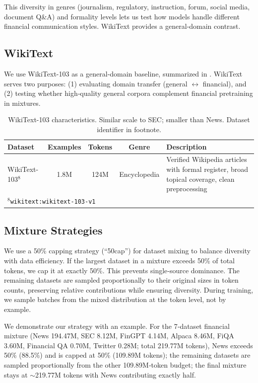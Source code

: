 This diversity in genres (journalism, regulatory, instruction, forum, social media, document Q\&A) and formality levels lets us test how models handle different financial communication styles. WikiText provides a general‑domain contrast.

\subsection{WikiText}

We use WikiText-103 \parencite{merity2016pointer} as a general‑domain baseline, summarized in . WikiText serves two purposes: (1) evaluating domain transfer (general $\leftrightarrow$ financial), and (2) testing whether high‑quality general corpora complement financial pretraining in mixtures.

\begin{table}[htbp]
\centering
\caption[WikiText Dataset Characteristics]{WikiText-103 characteristics. Similar scale to SEC; smaller than News. Dataset identifier in footnote.}
\label{tab:wikitext_dataset}
\small
\begin{tabular}{p{3.4cm}cccp{5.5cm}}
\toprule
\textbf{Dataset} & \textbf{Examples} & \textbf{Tokens} & \textbf{Genre} & \textbf{Description} \\
\midrule
WikiText-103$^8$ & 1.8M & 124M & Encyclopedia & Verified Wikipedia articles with formal register, broad topical coverage, clean preprocessing \\
\bottomrule
\multicolumn{5}{l}{\footnotesize $^8$\texttt{wikitext:wikitext-103-v1}}
\end{tabular}
\end{table}

\subsection{Mixture Strategies}

We use a 50\% capping strategy (``50cap'') for dataset mixing to balance diversity with data efficiency. If the largest dataset in a mixture exceeds 50\% of total tokens, we cap it at exactly 50\%. This prevents single‑source dominance. The remaining datasets are sampled proportionally to their original sizes in token counts, preserving relative contributions while ensuring diversity. During training, we sample batches from the mixed distribution at the token level, not by example.

We demonstrate our strategy with an example. For the 7‑dataset financial mixture (News 194.47M, SEC 8.12M, FinGPT 4.14M, Alpaca 8.46M, FiQA 3.60M, Financial QA 0.70M, Twitter 0.28M; total 219.77M tokens), News exceeds 50\% (88.5\%) and is capped at 50\% (109.89M tokens); the remaining datasets are sampled proportionally from the other 109.89M‑token budget; the final mixture stays at $\sim$219.77M tokens with News contributing exactly half.

